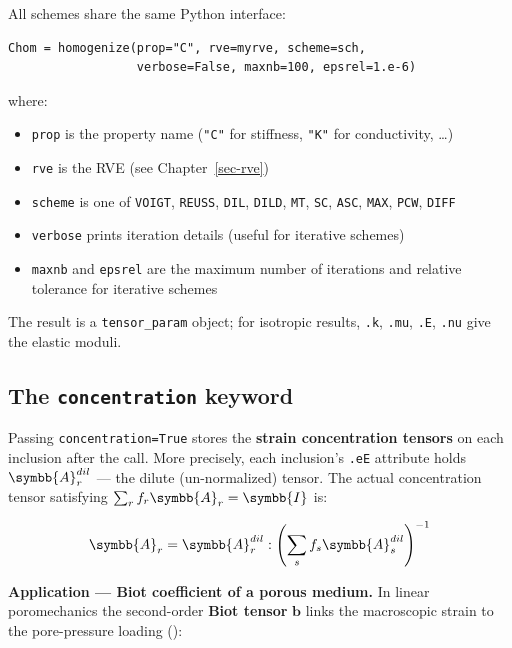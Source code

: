 \documentclass[
  a4paper,
  numbers=noendperiod,
  DIV=12]{scrreprt}
\providecommand{\tightlist}{%
  \setlength{\itemsep}{0pt}\setlength{\parskip}{0pt}}
\newcommand{\uu}[1]{{\symbf{{#1}}}}
\newcommand{\uuuu}[1]{{\symbb{{#1}}}}
\begin{document}
All schemes share the same Python interface:

\begin{verbatim}
Chom = homogenize(prop="C", rve=myrve, scheme=sch,
                  verbose=False, maxnb=100, epsrel=1.e-6)
\end{verbatim}

where:

\begin{itemize}
\tightlist
\item
  \texttt{prop} is the property name (\texttt{"C"} for stiffness,
  \texttt{"K"} for conductivity, \ldots)
\item
  \texttt{rve} is the RVE (see Chapter~\ref{sec-rve})
\item
  \texttt{scheme} is one of \texttt{VOIGT}, \texttt{REUSS},
  \texttt{DIL}, \texttt{DILD}, \texttt{MT}, \texttt{SC}, \texttt{ASC},
  \texttt{MAX}, \texttt{PCW}, \texttt{DIFF}
\item
  \texttt{verbose} prints iteration details (useful for iterative
  schemes)
\item
  \texttt{maxnb} and \texttt{epsrel} are the maximum number of
  iterations and relative tolerance for iterative schemes
\end{itemize}

The result is a \texttt{tensor\_param} object; for isotropic results,
\texttt{.k}, \texttt{.mu}, \texttt{.E}, \texttt{.nu} give the elastic
moduli.

\subsection{\texorpdfstring{The \texttt{concentration}
keyword}{The concentration keyword}}\label{sec-concentration-keyword}

Passing \texttt{concentration=True} stores the \textbf{strain
concentration tensors} on each inclusion after the call. More precisely,
each inclusion's \texttt{.eE} attribute holds \(\uuuu{A}_r^{dil}\) ---
the dilute (un-normalized) tensor. The actual concentration tensor
satisfying \(\sum_r f_r \uuuu{A}_r = \uuuu{I}\) is:

\[
\uuuu{A}_r = \uuuu{A}_r^{dil} : \left(\sum_s f_s \uuuu{A}_s^{dil}\right)^{-1}
\]

\textbf{Application --- Biot coefficient of a porous medium.} In linear
poromechanics the second-order \textbf{Biot tensor} \(\uu{b}\) links the
macroscopic strain to the pore-pressure loading
():
\end{document}
